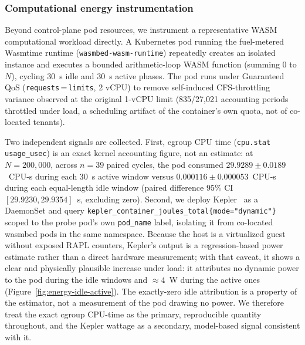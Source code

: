 \subsubsection{Computational energy instrumentation }\label{sec:energy-instrumentation}
Beyond control-plane pod resources, we instrument a representative WASM computational workload directly. A Kubernetes pod running the fuel-metered Wasmtime runtime (\texttt{wasmbed-wasm-runtime}) repeatedly creates an isolated instance and executes a bounded arithmetic-loop WASM function (summing $0$ to $N$), cycling 30~s idle and 30~s active phases. %
The pod runs under Guaranteed QoS (\texttt{requests}\,=\,\texttt{limits}, 2 vCPU) to remove self-induced CFS-throttling variance observed at the original 1-vCPU limit (835/27{,}021 accounting periods throttled under load, a scheduling artifact of the container's own quota, not of co-located tenants).

Two independent signals are collected. First, cgroup CPU time (\texttt{cpu.stat} \texttt{usage\_usec}) is an exact kernel accounting figure, not an estimate: at $N{=}200{,}000$, across $n{=}39$ paired cycles, the pod consumed $29.9289\pm0.0189$~CPU-s during each 30~s active window versus $0.000116\pm0.000053$~CPU-s during each equal-length idle window (paired difference 95\% CI $[29.9230, 29.9354]$~s, excluding zero). Second, we deploy Kepler~\cite{kepler} as a DaemonSet and query \texttt{kepler\_container\_joules\_total\{mode="dynamic"\}} scoped to the probe pod's own \texttt{pod\_name} label, isolating it from co-located wasmbed pods in the same namespace. 
Because the host is a virtualized guest without exposed RAPL counters, Kepler's output is a regression-based power estimate rather than a direct hardware measurement; with that caveat, it shows a clear and physically plausible increase under load: it attributes no dynamic power to the pod during the idle windows and ${\approx}4$~W during the active ones (Figure~\ref{fig:energy-idle-active}). {\color{red}The exactly-zero idle attribution is a property of the estimator, not a measurement of the pod drawing no power.} We therefore treat the exact cgroup CPU-time as the primary, reproducible quantity throughout, and the Kepler wattage as a secondary, model-based signal consistent with it.

